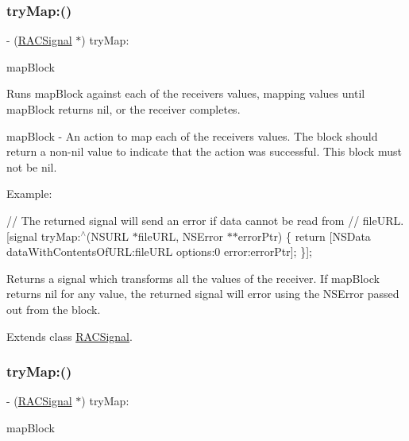 \subsubsection{\texorpdfstring{try\+Map\+:()}{tryMap:()}\hspace{0.1cm}{\footnotesize\ttfamily [2/3]}}
{\footnotesize\ttfamily -\/ (\mbox{\hyperlink{interface_r_a_c_signal}{R\+A\+C\+Signal}} $\ast$) try\+Map\+: \begin{DoxyParamCaption}\item[{(id($^\wedge$)(id value, N\+S\+Error $\ast$$\ast$error\+Ptr))}]{map\+Block }\end{DoxyParamCaption}}

Runs {\ttfamily map\+Block} against each of the receiver\textquotesingle{}s values, mapping values until {\ttfamily map\+Block} returns nil, or the receiver completes.

map\+Block -\/ An action to map each of the receiver\textquotesingle{}s values. The block should return a non-\/nil value to indicate that the action was successful. This block must not be nil.

Example\+:

// The returned signal will send an error if data cannot be read from // {\ttfamily file\+U\+RL}. \mbox{[}signal try\+Map\+:$^\wedge$(N\+S\+U\+RL $\ast$file\+U\+RL, N\+S\+Error $\ast$$\ast$error\+Ptr) \{ return \mbox{[}N\+S\+Data data\+With\+Contents\+Of\+U\+RL\+:file\+U\+RL options\+:0 error\+:error\+Ptr\mbox{]}; \}\mbox{]};

Returns a signal which transforms all the values of the receiver. If {\ttfamily map\+Block} returns nil for any value, the returned signal will error using the {\ttfamily N\+S\+Error} passed out from the block. 

Extends class \mbox{\hyperlink{interface_r_a_c_signal_a282c8989886b5b9a75e4ecb298221b58}{R\+A\+C\+Signal}}.

\mbox{\label{category_r_a_c_signal_07_operations_08_a282c8989886b5b9a75e4ecb298221b58}} 
\subsubsection{\texorpdfstring{try\+Map\+:()}{tryMap:()}\hspace{0.1cm}{\footnotesize\ttfamily [3/3]}}
{\footnotesize\ttfamily -\/ (\mbox{\hyperlink{interface_r_a_c_signal}{R\+A\+C\+Signal}} $\ast$) try\+Map\+: \begin{DoxyParamCaption}\item[{(id($^\wedge$)(id value, N\+S\+Error $\ast$$\ast$error\+Ptr))}]{map\+Block }\end{DoxyParamCaption}}

